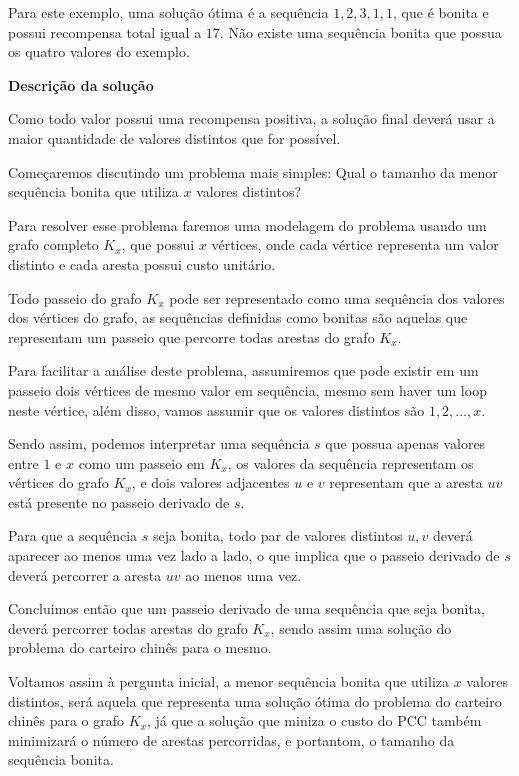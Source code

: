 \documentclass[12pt, a4paper]{article}
\begin{document}
        Para este exemplo, uma solução ótima é a sequência $1,2,3,1,1$, que é bonita e possui recompensa total igual a $17$. 
        Não existe uma sequência bonita que possua os quatro valores do exemplo.


        \textbf{Descrição da solução}

        Como todo valor possui uma recompensa positiva, a solução final deverá usar a maior quantidade de valores distintos que for possível.

        Começaremos discutindo um problema mais simples: Qual o tamanho da menor sequência bonita que utiliza $x$ valores distintos?

        Para resolver esse problema faremos uma modelagem do problema usando um grafo completo $K_x$, que possui $x$ vértices, onde cada vértice representa um valor distinto e cada aresta possui custo unitário.

        Todo passeio do grafo $K_x$ pode ser representado como uma sequência dos valores dos vértices do grafo, as sequências definidas como bonitas são aquelas que representam um passeio que percorre todas arestas do grafo $K_x$.

        Para facilitar a análise deste problema, assumiremos que pode existir em um passeio dois vértices de mesmo valor em sequência, mesmo sem haver um loop neste vértice, além disso, vamos assumir que os valores distintos são $1, 2, \dots, x$.

        Sendo assim, podemos interpretar uma sequência $s$ que possua apenas valores entre $1$ e $x$ como um passeio em $K_x$, os valores da sequência representam os vértices do grafo $K_x$, e dois valores adjacentes $u$ e $v$ representam que a aresta $uv$ está presente no passeio derivado de $s$. 
        
        Para que a sequência $s$ seja bonita, todo par de valores distintos $u, v$ deverá aparecer ao menos uma vez lado a lado, o que implica que o passeio derivado de $s$ deverá percorrer a aresta $uv$ ao menos uma vez.

        Concluimos então que um passeio derivado de uma sequência que seja bonita, deverá percorrer todas arestas do grafo $K_x$, sendo assim uma solução do problema do carteiro chinês para o mesmo.

        Voltamos assim à pergunta inicial, a menor sequência bonita que utiliza $x$ valores distintos, será aquela que representa uma solução ótima do problema do carteiro chinês para o grafo $K_x$, já que a solução que miniza o custo do PCC também minimizará o número de arestas percorridas, e portantom, o tamanho da sequência bonita. \\
 
\end{document}
